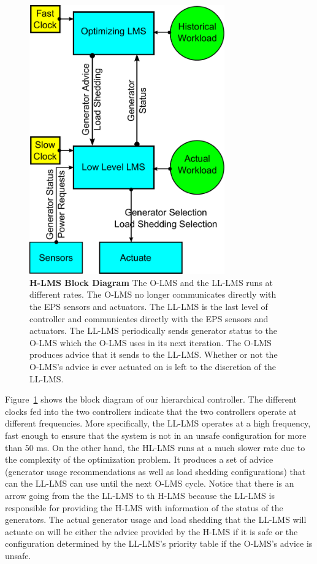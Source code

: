\documentclass{acm_proc_article-sp}
\begin{document}
\begin{figure}[htb]
  \centering
  \includegraphics[width=0.75\textwidth]{figures/H-LMS.pdf}
  \caption{\textbf{H-LMS Block Diagram} The O-LMS and the LL-LMS runs at different rates. The O-LMS no longer communicates directly with the EPS sensors
and actuators. The LL-LMS is the last level of controller and communicates directly with the EPS sensors and actuators. The LL-LMS periodically sends
generator status to the O-LMS which the O-LMS uses in its next iteration. The O-LMS produces advice that it sends to the LL-LMS. Whether or not the O-LMS's
advice is ever actuated on is left to the discretion of the LL-LMS.}
  \label{fig:H-LMS}
\end{figure}

Figure~\ref{fig:H-LMS} shows the block diagram of our hierarchical controller. The different clocks fed into the two controllers indicate that the two
controllers operate at different frequencies. More specifically, the LL-LMS operates at a high frequency, fast enough to ensure that the system is not
in an unsafe configuration for more than 50 ms. On the other hand, the HL-LMS runs at a much slower rate due to the complexity of the optimization problem.
It produces a set of advice (generator usage recommendations as well as load shedding configurations) that can the LL-LMS can use until the next O-LMS 
cycle. Notice that there is an arrow going from the the LL-LMS to th H-LMS because the LL-LMS is responsible for providing the H-LMS with information of
the status of the generators. The actual generator usage and load shedding that the LL-LMS will actuate on will be either the advice provided by the H-LMS
if it is safe or the configuration determined by the LL-LMS's priority table if the O-LMS's advice is unsafe.
\end{document}
